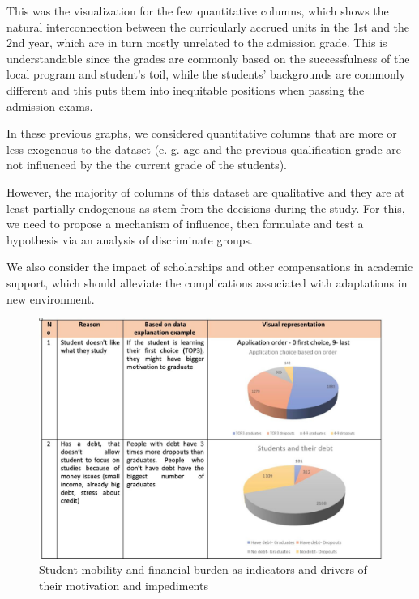 \documentclass[
  letterpaper,
  DIV=11,
  numbers=noendperiod]{scrartcl}
\begin{document}
This was the visualization for the few quantitative columns, which shows
the natural interconnection between the curricularly accrued units in
the 1st and the 2nd year, which are in turn mostly unrelated to the
admission grade. This is understandable since the grades are commonly
based on the successfulness of the local program and student's toil,
while the students' backgrounds are commonly different and this puts
them into inequitable positions when passing the admission exams.

In these previous graphs, we considered quantitative columns that are
more or less exogenous to the dataset (e. g. age and the previous
qualification grade are not influenced by the the current grade of the
students).

However, the majority of columns of this dataset are qualitative and
they are at least partially endogenous as stem from the decisions during
the study. For this, we need to propose a mechanism of influence, then
formulate and test a hypothesis via an analysis of discriminate groups.

We also consider the impact of scholarships and other compensations in
academic support, which should alleviate the complications associated
with adaptations in new environment.

\begin{figure}

{\centering \includegraphics{./figs/reasons-1.jpg}

}

\caption{\label{fig-word-1}Student mobility and financial burden as
indicators and drivers of their motivation and impediments}

\end{figure}
\end{document}
